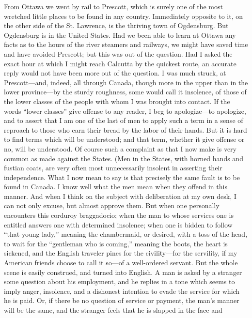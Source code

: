 From Ottawa we went by rail to Prescott, which is surely one of the
most wretched little places to be found in any country.
Immediately opposite to it, on the other side of the St. Lawrence,
is the thriving town of Ogdensburg.  But Ogdensburg is in the
United States.  Had we been able to learn at Ottawa any facts as to
the hours of the river steamers and railways, we might have saved
time and have avoided Prescott; but this was out of the question.
Had I asked the exact hour at which I might reach Calcutta by the
quickest route, an accurate reply would not have been more out of
the question.  I was much struck, at Prescott---and, indeed, all
through Canada, though more in the upper than in the lower
province---by the sturdy roughness, some would call it insolence, of
those of the lower classes of the people with whom I was brought
into contact.  If the words ``lower classes'' give offense to any
reader, I beg to apologize---to apologize, and to assert that I am
one of the last of men to apply such a term in a sense of reproach
to those who earn their bread by the labor of their hands.  But it
is hard to find terms which will be understood; and that term,
whether it give offense or no, will be understood.  Of course such
a complaint as that I now make is very common as made against the
States.  (Men in the States, with horned hands and fustian coats,
are very often most unnecessarily insolent in asserting their
independence.  What I now mean to say is that precisely the same
fault is to be found in Canada.  I know well what the men mean when
they offend in this manner.  And when I think on the subject with
deliberation at my own desk, I can not only excuse, but almost
approve them.  But when one personally encounters this corduroy
braggadocio; when the man to whose services one is entitled answers
one with determined insolence; when one is bidden to follow ``that
young lady,'' meaning the chambermaid, or desired, with a toss of
the head, to wait for the ``gentleman who is coming,'' meaning the
boots, the heart is sickened, and the English traveler pines for
the civility---for the servility, if my American friends choose to
call it so---of a well-ordered servant.  But the whole scene is
easily construed, and turned into English.  A man is asked by a
stranger some question about his employment, and he replies in a
tone which seems to imply anger, insolence, and a dishonest
intention to evade the service for which he is paid.  Or, if there
be no question of service or payment, the man's manner will be the
same, and the stranger feels that he is slapped in the face and
